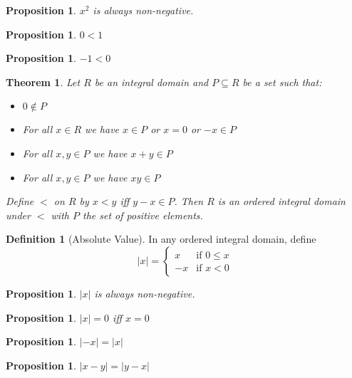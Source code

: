 \documentclass{article}
\newtheorem{proposition}[axiom]{Proposition}
\newtheorem{theorem}[axiom]{Theorem}
\theoremstyle{definition}
\newtheorem{definition}[axiom]{Definition}
\begin{document}
    \begin{proposition}
        $x^2$ is always non-negative.
    \end{proposition}

    \begin{proposition}
        $0 < 1$
    \end{proposition}

    \begin{proposition}
        $-1 < 0$
    \end{proposition}

    \begin{theorem}
        Let $R$ be an integral domain and $P \subseteq R$ be a set such that:
        \begin{itemize}
            \item $0 \notin P$
            \item For all $x \in R$ we have $x \in P$ or $x = 0$ or $-x \in P$
            \item For all $x,y \in P$ we have $x+y \in P$
            \item For all $x,y \in P$ we have $xy \in P$
        \end{itemize}
        Define $<$ on $R$ by $x < y$ iff $y - x \in P$. Then $R$ is an ordered integral domain under $<$
        with $P$ the set of positive elements.
    \end{theorem}

    \begin{definition}[Absolute Value]
        In any ordered integral domain, define
        \[ |x| = \begin{cases}
            x & \text{if $0 \leq x$} \\
            -x & \text{if $x < 0$}
        \end{cases} \]
    \end{definition}

    \begin{proposition}
        $|x|$ is always non-negative.
    \end{proposition}

    \begin{proposition}
        $|x| = 0$ iff $x = 0$
    \end{proposition}

    \begin{proposition}
        $|-x| = |x|$
    \end{proposition}

    \begin{proposition}
        $|x-y| = |y-x|$
    \end{proposition}
\end{document}
